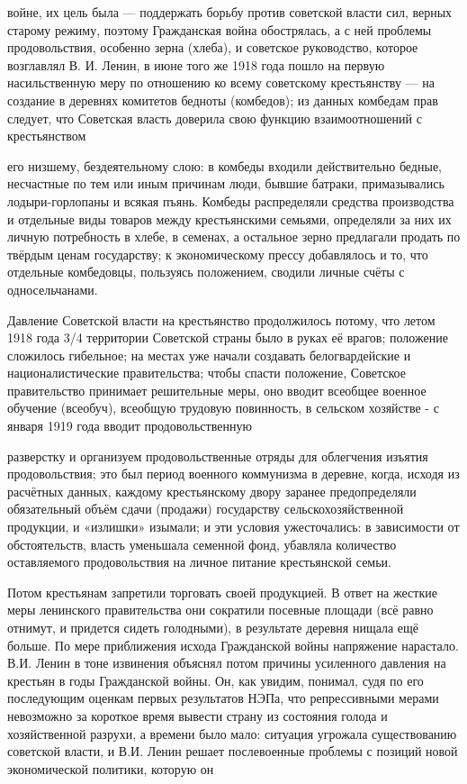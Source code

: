 \label{083-1}
войне, их цель была — поддержать борьбу против советской власти сил, верных старому режиму, поэтому Гражданская война обострялась, а с ней проблемы продовольствия, особенно зерна (хлеба), и советское руководство, которое возглавлял В. И. Ленин, в июне того же 1918 года пошло на первую насильственную меру по отношению ко всему советскому крестьянству — на создание в деревнях комитетов бедноты (комбедов); из данных комбедам прав следует, что Советская власть доверила свою функцию взаимоотношений с крестьянством 

\label{084-1}
его низшему, бездеятельному слою: в комбеды входили действительно бедные, несчастные по тем или иным причинам люди, бывшие батраки, примазывались лодыри-горлопаны и всякая пъянь. Комбеды распределяли средства производства и отдельные виды товаров между крестьянскими семьями, определяли за них их личную потребность в хлебе, в семенах, а остальное зерно предлагали продать по твёрдым ценам государству; к экономическому прессу добавлялось и то, что отдельные комбедовцы, пользуясь положением, сводили личные счёты с односельчанами.

\label{085-1}
Давление Советской власти на крестьянство продолжилось потому, что летом 1918 года 3/4 территории Советской страны было в руках её врагов; положение сложилось гибельное; на местах уже начали создавать белогвардейские и националистические правительства; чтобы спасти положение, Советское правительство принимает решительные меры, оно вводит всеобщее военное обучение (всеобуч), всеобщую трудовую повинность, в сельском хозяйстве - с января 1919 года вводит продовольственную

\label{086-1}
разверстку и организуем продовольственные отряды для облегчения изъятия продовольствия; это был период военного коммунизма в деревне, когда, исходя из расчётных данных, каждому крестьянскому двору заранее предопределяли обязательный объём сдачи (продажи) государству сельскохозяйственной продукции, и «излишки» изымали; и эти условия ужесточались: в зависимости от обстоятельств, власть уменьшала семенной фонд, убавляла количество оставляемого продовольствия на личное питание крестьянской семьи.

\label{087-1}
Потом крестьянам запретили торговать своей продукцией. В ответ на жесткие меры ленинского правительства они сократили посевные площади (всё равно отнимут, и придется сидеть голодными), в результате деревня нищала ещё больше. По мере приближения исхода Гражданской войны напряжение нарастало. В.И. Ленин в тоне извинения объяснял потом причины усиленного давления на крестьян в годы Гражданской войны. Он, как увидим, понимал, судя по его последующим оценкам первых результатов НЭПа, что репрессивными мерами невозможно за короткое время вывести страну из состояния голода и хозяйственной разрухи, а времени было мало: ситуация угрожала существованию советской власти, и В.И. Ленин решает послевоенные проблемы с позиций новой экономической политики, которую он 

